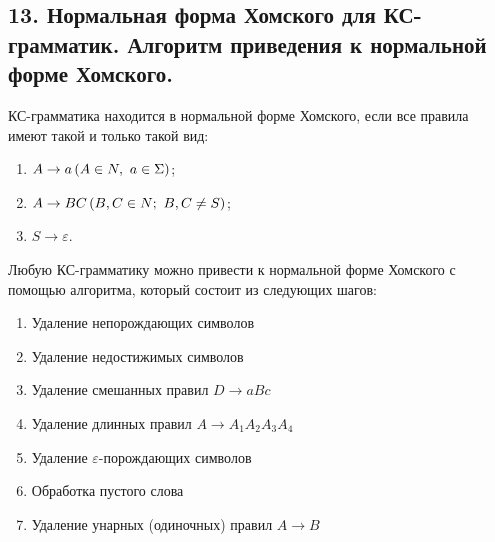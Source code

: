 \subsection{13. Нормальная форма Хомского для КС-грамматик. Алгоритм приведения к нормальной форме Хомского.}

\Def КС-грамматика находится в нормальной форме Хомского, если все правила имеют такой и только такой вид:

\begin{enumerate}
    \item $A \rightarrow a \left({A \in N, \,\, a \in \Sigma}\right)$;
    \item $A \rightarrow BC \left({B, C \in N; \,\, B, C \neq S}\right)$;
    \item $S \rightarrow \varepsilon$.
\end{enumerate}


\Statement Любую КС-грамматику можно привести к нормальной форме Хомского с помощью алгоритма, который состоит из следующих шагов:

\begin{enumerate}
    \item Удаление непорождающих символов
    \item Удаление недостижимых символов
    \item Удаление смешанных правил $D \rightarrow aBc$
    \item Удаление длинных правил $A \rightarrow A_1 A_2 A_3 A_4$
    \item Удаление $\varepsilon$-порождающих символов
    \item Обработка пустого слова
    \item Удаление унарных (одиночных) правил $A \rightarrow B$
\end{enumerate}

